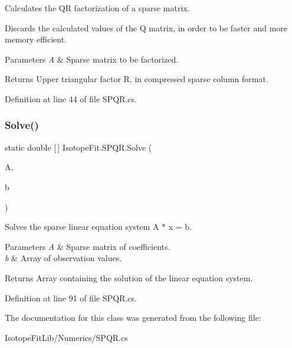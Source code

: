 Calculates the QR factorization of a sparse matrix. 

Discards the calculated values of the Q matrix, in order to be faster and more memory efficient. 


\begin{DoxyParams}{Parameters}
{\em A} & Sparse matrix to be factorized.\\
\hline
\end{DoxyParams}
\begin{DoxyReturn}{Returns}
Upper triangular factor R, in compressed sparse column format.
\end{DoxyReturn}


Definition at line 44 of file S\+P\+Q\+R.\+cs.

\mbox{\label{class_isotope_fit_1_1_s_p_q_r_a69087f39b9436dc5c8aff4649b18eb46}} 
\subsubsection{\texorpdfstring{Solve()}{Solve()}}
{\footnotesize\ttfamily static double \mbox{[}$\,$\mbox{]} Isotope\+Fit.\+S\+P\+Q\+R.\+Solve (\begin{DoxyParamCaption}\item[{Sparse\+Matrix}]{A,  }\item[{double \mbox{[}$\,$\mbox{]}}]{b }\end{DoxyParamCaption})\hspace{0.3cm}{\ttfamily [static]}}



Solves the sparse linear equation system A $\ast$ x = b. 


\begin{DoxyParams}{Parameters}
{\em A} & Sparse matrix of coefficients.\\
\hline
{\em b} & Array of observation values.\\
\hline
\end{DoxyParams}
\begin{DoxyReturn}{Returns}
Array containing the solution of the linear equation system.
\end{DoxyReturn}


Definition at line 91 of file S\+P\+Q\+R.\+cs.



The documentation for this class was generated from the following file\+:\begin{DoxyCompactItemize}
\item 
Isotope\+Fit\+Lib/\+Numerics/S\+P\+Q\+R.\+cs\end{DoxyCompactItemize}
